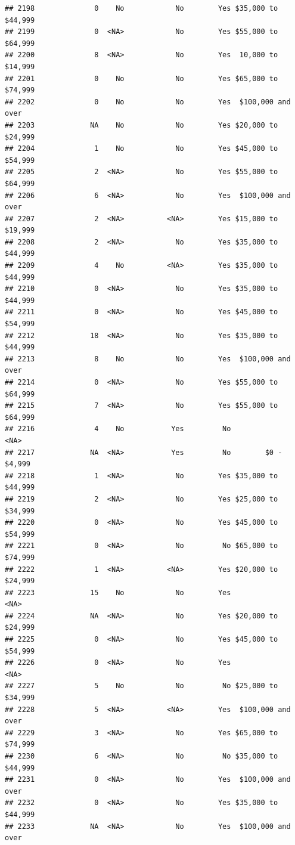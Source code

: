 \documentclass[man]{apa6}
\begin{document}
\begin{verbatim}
## 2198              0    No            No        Yes $35,000 to $44,999
## 2199              0  <NA>            No        Yes $55,000 to $64,999
## 2200              8  <NA>            No        Yes  10,000 to $14,999
## 2201              0    No            No        Yes $65,000 to $74,999
## 2202              0    No            No        Yes  $100,000 and over
## 2203             NA    No            No        Yes $20,000 to $24,999
## 2204              1    No            No        Yes $45,000 to $54,999
## 2205              2  <NA>            No        Yes $55,000 to $64,999
## 2206              6  <NA>            No        Yes  $100,000 and over
## 2207              2  <NA>          <NA>        Yes $15,000 to $19,999
## 2208              2  <NA>            No        Yes $35,000 to $44,999
## 2209              4    No          <NA>        Yes $35,000 to $44,999
## 2210              0  <NA>            No        Yes $35,000 to $44,999
## 2211              0  <NA>            No        Yes $45,000 to $54,999
## 2212             18  <NA>            No        Yes $35,000 to $44,999
## 2213              8    No            No        Yes  $100,000 and over
## 2214              0  <NA>            No        Yes $55,000 to $64,999
## 2215              7  <NA>            No        Yes $55,000 to $64,999
## 2216              4    No           Yes         No               <NA>
## 2217             NA  <NA>           Yes         No        $0 - $4,999
## 2218              1  <NA>            No        Yes $35,000 to $44,999
## 2219              2  <NA>            No        Yes $25,000 to $34,999
## 2220              0  <NA>            No        Yes $45,000 to $54,999
## 2221              0  <NA>            No         No $65,000 to $74,999
## 2222              1  <NA>          <NA>        Yes $20,000 to $24,999
## 2223             15    No            No        Yes               <NA>
## 2224             NA  <NA>            No        Yes $20,000 to $24,999
## 2225              0  <NA>            No        Yes $45,000 to $54,999
## 2226              0  <NA>            No        Yes               <NA>
## 2227              5    No            No         No $25,000 to $34,999
## 2228              5  <NA>          <NA>        Yes  $100,000 and over
## 2229              3  <NA>            No        Yes $65,000 to $74,999
## 2230              6  <NA>            No         No $35,000 to $44,999
## 2231              0  <NA>            No        Yes  $100,000 and over
## 2232              0  <NA>            No        Yes $35,000 to $44,999
## 2233             NA  <NA>            No        Yes  $100,000 and over

\end{verbatim}
\end{document}
